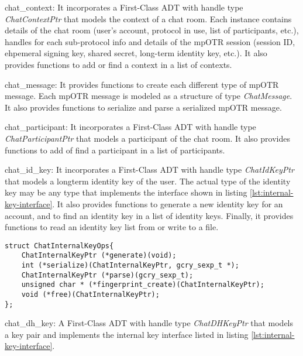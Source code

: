 \begin{description}
  \item chat\_context: It incorporates a First-Class ADT with handle type \emph{ChatContextPtr} that models the context of a chat room. Each instance contains details of the chat room (user's account, protocol in use, list of participants, etc.), handles for each sub-protocol info and details of the mpOTR session (session ID, ehpemeral signing key, shared secret, long-term identity key, etc.). It also provides functions to add or find a context in a list of contexts.

  \item chat\_message: It provides functions to create each different type of mpOTR message. Each mpOTR message is modeled as a structure of type \emph{ChatMessage}. It also provides functions to serialize and parse a serialized mpOTR message.

  \item chat\_participant: It incorporates a First-Class ADT with handle type \emph{ChatParticipantPtr} that models a participant of the chat room. It also provides functions to add of find a participant in a list of participants.
  
  \item chat\_id\_key: It incorporates a First-Class ADT with handle type \emph{ChatIdKeyPtr} that models a longterm identity key of the user. The actual type of the identity key may be any type that implements the interface shown in listing \ref{lst:internal-key-interface}. It also provides functions to generate a new identity key for an account, and to find an identity key in a list of identity keys. Finally, it provides functions to read an identity key list from or write to a file.
  
\begin{lstlisting}[caption={Internal key interface},label={lst:internal-key-interface}]
struct ChatInternalKeyOps{
    ChatInternalKeyPtr (*generate)(void);
    int (*serialize)(ChatInternalKeyPtr, gcry_sexp_t *);
    ChatInternalKeyPtr (*parse)(gcry_sexp_t);
    unsigned char * (*fingerprint_create)(ChatInternalKeyPtr);
    void (*free)(ChatInternalKeyPtr);
};
\end{lstlisting}

  \item chat\_dh\_key: A First-Class ADT with handle type \emph{ChatDHKeyPtr} that models a \dhname key pair and implements the internal key interface listed in listing \ref{lst:internal-key-interface}.


\end{description}
